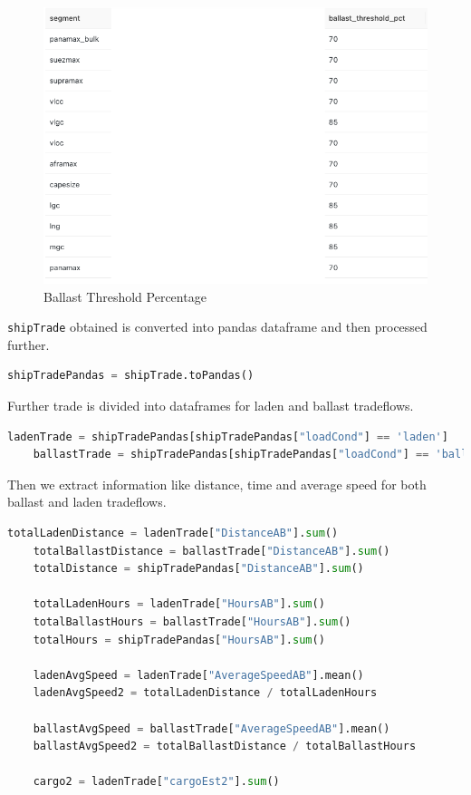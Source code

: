 \begin{figure}[h]
    \centering
    \includegraphics[width=1\textwidth]{images/segment_parameters.png}
    \caption{Ballast Threshold Percentage}
    \label{segment_parameters}
\end{figure}

\texttt{shipTrade} obtained  is converted into pandas dataframe and then processed further.

\begin{lstlisting}[language=python, caption=shipTrade pandas dataframe]
    shipTradePandas = shipTrade.toPandas()
\end{lstlisting}

Further trade is divided into dataframes for laden and ballast tradeflows.

\begin{lstlisting}[language=python, caption=laden and ballast tradeflows]
    ladenTrade = shipTradePandas[shipTradePandas["loadCond"] == 'laden']
    ballastTrade = shipTradePandas[shipTradePandas["loadCond"] == 'ballast']
\end{lstlisting}

Then we extract information like distance, time and average speed for both ballast and laden tradeflows.

\begin{lstlisting}[language=python, caption={Determing distance, time and average speed}]
    totalLadenDistance = ladenTrade["DistanceAB"].sum()
    totalBallastDistance = ballastTrade["DistanceAB"].sum()
    totalDistance = shipTradePandas["DistanceAB"].sum()

    totalLadenHours = ladenTrade["HoursAB"].sum()
    totalBallastHours = ballastTrade["HoursAB"].sum()
    totalHours = shipTradePandas["HoursAB"].sum()

    ladenAvgSpeed = ladenTrade["AverageSpeedAB"].mean()
    ladenAvgSpeed2 = totalLadenDistance / totalLadenHours
    
    ballastAvgSpeed = ballastTrade["AverageSpeedAB"].mean()
    ballastAvgSpeed2 = totalBallastDistance / totalBallastHours
  
    cargo2 = ladenTrade["cargoEst2"].sum()


\end{lstlisting}

